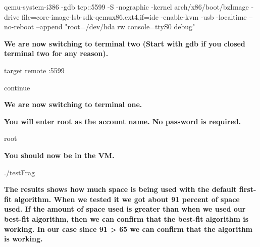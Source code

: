 \documentclass[journal,10pt,onecolumn,letterpaper,draftclsnofoot]{IEEEtran}
\begin{document}
qemu-system-i386 -gdb tcp::5599 -S -nographic -kernel arch/x86/boot/bzImage -drive file=core-image-lsb-sdk-qemux86.ext4,if=ide -enable-kvm -usb -localtime --no-reboot --append "root=/dev/hda rw console=ttyS0 debug"\newline

\textbf{We are now switching to terminal two (Start with gdb if you closed terminal two for any reason).\newline}

target remote :5599\newline

continue\newline

\textbf{We are now switching to terminal one.\newline}

\textbf{You will enter root as the account name. No password is required.\newline}

root\newline

\textbf{You should now be in the VM.\newline}

./testFrag\newline

\textbf{The results shows how much space is being used with the default first-fit algorithm.
When we tested it we got about 91 percent of space used. If the amount of space used is greater than when we used our best-fit algorithm, then we can confirm that the best-fit algorithm is working. In our case since 91 > 65 we can confirm that the algorithm is working.\newline}
\end{document}
